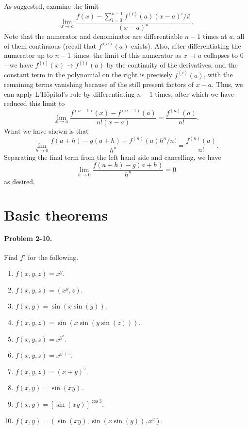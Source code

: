 \documentclass[11pt]{report}
\newcommand{\problem}[1]{\paragraph{Problem #1.}}
\begin{document}
\begin{enumerate}
        As suggested, examine the limit \[
            \lim_{x \to a} \frac{f(x) - \sum_{i = 0}^{n - 1} f^{(i)}(a)(x - a)^i /
            i!}{(x - a)^n}.
        \] Note that the numerator and denominator are differentiable $n - 1$ times
        at $a$, all of them continuous (recall that $f^{(n)}(a)$ exists). Also, after
        differentiating the numerator up to $n - 1$ times, the limit of this
        numerator as $x \to a$ collapses to $0$ -- we have $f^{(i)}(x) \to
        f^{(i)}(a)$ by the continuity of the derivatives, and the constant term in
        the polynomial on the right is precisely $f^{(i)}(a)$, with the remaining
        terms vanishing because of the still present factors of $x - a$. Thus, we can
        apply L'H\^opital's rule by differentiating $n - 1$ times, after which we
        have reduced this limit to \[
            \lim_{x \to a} \frac{f^{(n - 1)}(x) - f^{(n - 1)}(a)}{n!(x - a)} =
            \frac{f^{(n)}(a)}{n!}.
        \] What we have shown is that \[
            \lim_{h \to 0} \frac{f(a + h) - g(a + h) + f^{(n)}(a)h^n / n!}{h^n} =
            \frac{f^{(n)}(a)}{n!}.
        \] Separating the final term from the left hand side and cancelling, we have
        \[
            \lim_{h \to 0} \frac{f(a + h) - g(a + h)}{h^n} = 0
        \] as desired.
    \end{enumerate}


    \section{Basic theorems}

    \problem{2-10} Find $f'$ for the following. \begin{enumerate}
        \itemsep0em
        \item $f(x, y, z) = x^y$.
        \item $f(x, y, z) = (x^y, z)$.
        \item $f(x, y) = \sin(x\sin(y))$.
        \item $f(x, y, z) = \sin(x\sin(y\sin(z)))$.
        \item $f(x, y, z) = x^{y^z}$.
        \item $f(x, y, z) = x^{y + z}$.
        \item $f(x, y, z) = (x + y)^z$.
        \item $f(x, y) = \sin(xy)$.
        \item $f(x, y) = [\sin(xy)]^{\cos{3}}$.
        \item $f(x, y) = (\sin(xy), \sin(x\sin(y)), x^y)$.
    \end{enumerate}
\end{document}

